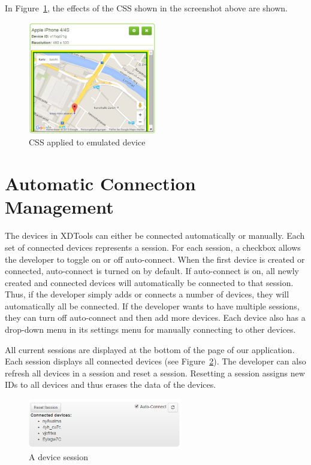 In Figure~\ref{fig:css_applied}, the effects of the CSS shown in the screenshot above are shown. 

\begin{figure}[H]
  \centering
    \includegraphics[width=0.5\textwidth]{images/screenshots/emulated_device_4.png}
	\caption[Screenshot: CSS effects]{CSS applied to emulated device}
	\label{fig:css_applied}
\end{figure}

\section{Automatic Connection Management}

The devices in XDTools can either be connected automatically or manually. Each set of connected devices represents a session. For each session, a checkbox allows the developer to toggle on or off auto-connect. When the first device is created or connected, auto-connect is turned on by default. If auto-connect is on, all newly created and connected devices will automatically be connected to that session. Thus, if the developer simply adds or connects a number of devices, they will automatically all be connected. If the developer wants to have multiple sessions, they can turn off auto-connect and then add more devices. Each device also has a drop-down menu in its settings menu for manually connecting to other devices. 

All current sessions are displayed at the bottom of the page of our application. Each session displays all connected devices (see Figure~\ref{fig:sessions}). The developer can also refresh all devices in a session and reset a session. Resetting a session assigns new IDs to all devices and thus erases the data of the devices. 

\begin{figure}[H]
  \centering
    \includegraphics[width=0.6\textwidth]{images/screenshots/session_management.png}
	\caption[Screenshot: Session]{A device session}
	\label{fig:sessions}
\end{figure}

